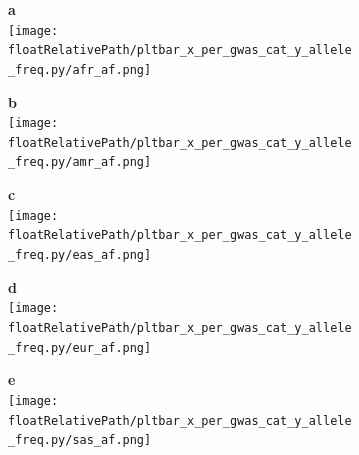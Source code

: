 \begin{figure}[!tbp]

    \begin{subfigure}[]{.32\textwidth}
        \textbf{a}
        \\
        \texttt{[image: \\floatRelativePath/pltbar\_x\_per\_gwas\_cat\_y\_allele\_freq.py/afr\_af.png]}
    \end{subfigure}
%
    \begin{subfigure}[]{.32\textwidth}
        \textbf{b}
        \\
        \texttt{[image: \\floatRelativePath/pltbar\_x\_per\_gwas\_cat\_y\_allele\_freq.py/amr\_af.png]}
    \end{subfigure}
%
    \begin{subfigure}[]{.32\textwidth}
        \textbf{c}
        \\
        \texttt{[image: \\floatRelativePath/pltbar\_x\_per\_gwas\_cat\_y\_allele\_freq.py/eas\_af.png]}
    \end{subfigure}

    \centering
    \begin{subfigure}[]{.32\textwidth}
        \textbf{d}
        \\
        \texttt{[image: \\floatRelativePath/pltbar\_x\_per\_gwas\_cat\_y\_allele\_freq.py/eur\_af.png]}
    \end{subfigure}
%
    \begin{subfigure}[]{.32\textwidth}
        \textbf{e}
        \\
        \texttt{[image: \\floatRelativePath/pltbar\_x\_per\_gwas\_cat\_y\_allele\_freq.py/sas\_af.png]}
    \end{subfigure}

    \caption{}

\end{figure}
